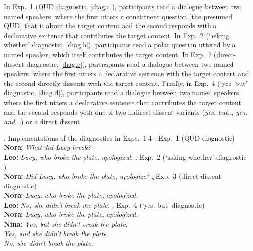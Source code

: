 \documentclass[times,linguex,xcolor]{glossa}
\begin{document}
      In Exp.~1 (QUD diagnostic, \ref{diag.a}), participants read a dialogue between two named speakers, where the first utters a constituent question (the presumed QUD) that is about the target content and the second responds with a declarative sentence that contributes the target content. In Exp.~2 (`asking whether' diagnostic, \ref{diag.b}), participants read a polar question uttered by a named speaker, which itself contributes the target content.
      In Exp.~3 (direct-dissent diagnostic, \ref{diag.c}), participants read a dialogue between two named speakers, where the first utters a declarative sentence with the target content and the second directly dissents with the target content. 
      Finally, in Exp.~4 (`yes, but' diagnostic, \ref{diag.d}), participants read a dialogue between two named speakers where the first utters a declarative sentence that contributes the target content and the second responds with one of two indirect dissent variants (\emph{yes, but..}, \emph{yes, and...}) or a direct dissent.

      \ex.\label{diag} Implementations of the diagnostics in Exps.~1-4
      \a.\label{diag.a} Exp.~1 (QUD diagnostic)
      \\ {\bf Nora:} \emph{What did Lucy break?}
      \\ {\bf Leo:} \emph{Lucy, who broke the plate, apologized.}
      \b.\label{diag.b} Exp.~2 (`asking whether' diagnostic )
      \\ {\bf Nora:} \emph{Did Lucy, who broke the plate, apologize?}
      \c.\label{diag.c} Exp.~3 (direct-dissent diagnostic)
      \\ {\bf Nora:} \emph{Lucy, who broke the plate, apologized.}
      \\ {\bf Leo:} \emph{No, she didn't break the plate.}
      \d.\label{diag.d} Exp.~4 (`yes, but' diagnostic)
      \\ {\bf Nora:} \emph{Lucy, who broke the plate, apologized.}
      \\ {\bf Nina:} \emph{Yes, but she didn't break the plate.}
      \\ \hspace*{1cm} \emph{Yes, and she didn't break the plate.}
      \\ \hspace*{1cm} \emph{No, she didn't break the plate.}
\end{document}
